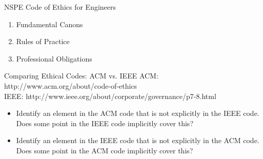 \documentclass{beamer}
\begin{document}
\begin{frame}{NSPE Code of Ethics for Engineers \href{http://www.nspe.org/Ethics/CodeofEthics/}{}}
\begin{enumerate}
\item Fundamental Canons
\item Rules of Practice
\item Professional Obligations
\end{enumerate}
\end{frame}

\begin{frame}{Comparing Ethical Codes: ACM vs. IEEE}
ACM: http://www.acm.org/about/code-of-ethics \\
IEEE: http://www.ieee.org/about/corporate/governance/p7-8.html
\bigskip
\begin{itemize}
\item Identify an element in the ACM code that is not explicitly in the IEEE code. Does some point in the IEEE code implicitly cover this?
\item Identify an element in the IEEE code that is not explicitly in the ACM code. Does some point in the ACM code implicitly cover this?
\end{itemize}
\end{frame}

\end{document}
